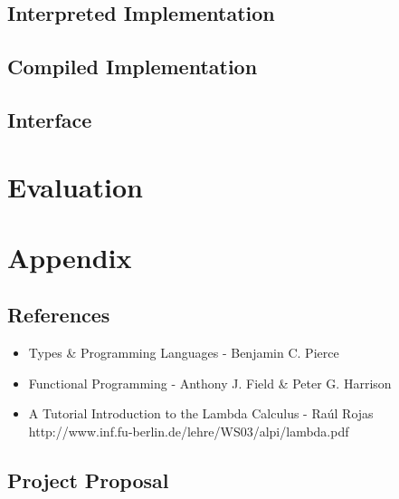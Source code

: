 \documentclass{article}
\begin{document}
\subsection{Interpreted Implementation}
\subsection{Compiled Implementation}
\subsection{Interface}

\pagebreak
\section{Evaluation}

\pagebreak
\section{Appendix}
\subsection{References}
\begin{itemize}
    \item Types \& Programming Languages - Benjamin C. Pierce
    \item Functional Programming - Anthony J. Field \& Peter G. Harrison
    \item A Tutorial Introduction to the Lambda Calculus - Ra\'{u}l Rojas \\
        http://www.inf.fu-berlin.de/lehre/WS03/alpi/lambda.pdf
\end{itemize}

\subsection{Project Proposal}
\end{document}
